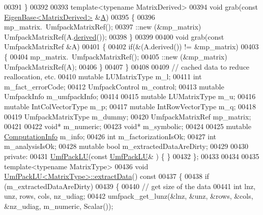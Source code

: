 \begin{DoxyCode}
00391     \}
00392 
00393     \textcolor{keyword}{template}<\textcolor{keyword}{typename} MatrixDerived>
00394     \textcolor{keywordtype}{void} grab(\textcolor{keyword}{const} \hyperlink{group___core___module_struct_eigen_1_1_eigen_base}{EigenBase<MatrixDerived>} &\hyperlink{group___core___module_class_eigen_1_1_matrix}{A})
00395     \{
00396       mp\_matrix.~UmfpackMatrixRef();
00397       ::new (&mp\_matrix) UmfpackMatrixRef(A.\hyperlink{group___core___module_a324b16961a11d2ecfd2d1b7dd7946545}{derived}());
00398     \}
00399 
00400     \textcolor{keywordtype}{void} grab(\textcolor{keyword}{const} UmfpackMatrixRef &A)
00401     \{
00402       \textcolor{keywordflow}{if}(&(A.derived()) != &mp\_matrix)
00403       \{
00404         mp\_matrix.~UmfpackMatrixRef();
00405         ::new (&mp\_matrix) UmfpackMatrixRef(A);
00406       \}
00407     \}
00408 
00409     \textcolor{comment}{// cached data to reduce reallocation, etc.}
00410     \textcolor{keyword}{mutable} LUMatrixType m\_l;
00411     \textcolor{keywordtype}{int} m\_fact\_errorCode;
00412     UmfpackControl m\_control;
00413     \textcolor{keyword}{mutable} UmfpackInfo m\_umfpackInfo;
00414 
00415     \textcolor{keyword}{mutable} LUMatrixType m\_u;
00416     \textcolor{keyword}{mutable} IntColVectorType m\_p;
00417     \textcolor{keyword}{mutable} IntRowVectorType m\_q;
00418 
00419     UmfpackMatrixType m\_dummy;
00420     UmfpackMatrixRef mp\_matrix;
00421 
00422     \textcolor{keywordtype}{void}* m\_numeric;
00423     \textcolor{keywordtype}{void}* m\_symbolic;
00424 
00425     \textcolor{keyword}{mutable} \hyperlink{group__enums_ga85fad7b87587764e5cf6b513a9e0ee5e}{ComputationInfo} m\_info;
00426     \textcolor{keywordtype}{int} m\_factorizationIsOk;
00427     \textcolor{keywordtype}{int} m\_analysisIsOk;
00428     \textcolor{keyword}{mutable} \textcolor{keywordtype}{bool} m\_extractedDataAreDirty;
00429 
00430   \textcolor{keyword}{private}:
00431     \hyperlink{class_eigen_1_1_umf_pack_l_u}{UmfPackLU}(\textcolor{keyword}{const} \hyperlink{class_eigen_1_1_umf_pack_l_u}{UmfPackLU}& ) \{ \}
00432 \};
00433 
00434 
00435 \textcolor{keyword}{template}<\textcolor{keyword}{typename} MatrixType>
00436 \textcolor{keywordtype}{void} \hyperlink{class_eigen_1_1_umf_pack_l_u}{UmfPackLU<MatrixType>::extractData}()\textcolor{keyword}{ const}
00437 \textcolor{keyword}{}\{
00438   \textcolor{keywordflow}{if} (m\_extractedDataAreDirty)
00439   \{
00440     \textcolor{comment}{// get size of the data}
00441     \textcolor{keywordtype}{int} lnz, unz, rows, cols, nz\_udiag;
00442     umfpack\_get\_lunz(&lnz, &unz, &rows, &cols, &nz\_udiag, m\_numeric, Scalar());

\end{DoxyCode}
